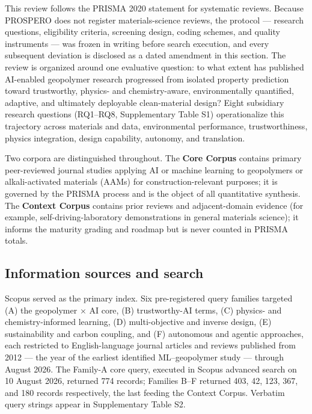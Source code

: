\documentclass[pdflatex,sn-basic]{sn-jnl}
\begin{document}
This review follows the PRISMA 2020 statement for systematic reviews. Because PROSPERO does not register materials-science reviews, the protocol --- research questions, eligibility criteria, screening design, coding schemes, and quality instruments --- was frozen in writing before search execution, and every subsequent deviation is disclosed as a dated amendment in this section. The review is organized around one evaluative question: to what extent has published AI-enabled geopolymer research progressed from isolated property prediction toward trustworthy, physics- and chemistry-aware, environmentally quantified, adaptive, and ultimately deployable clean-material design? Eight subsidiary research questions (RQ1--RQ8, Supplementary Table S1) operationalize this trajectory across materials and data, environmental performance, trustworthiness, physics integration, design capability, autonomy, and translation.

Two corpora are distinguished throughout. The \textbf{Core Corpus} contains primary peer-reviewed journal studies applying AI or machine learning to geopolymers or alkali-activated materials (AAMs) for construction-relevant purposes; it is governed by the PRISMA process and is the object of all quantitative synthesis. The \textbf{Context Corpus} contains prior reviews and adjacent-domain evidence (for example, self-driving-laboratory demonstrations in general materials science); it informs the maturity grading and roadmap but is never counted in PRISMA totals.

\subsection{Information sources and search}

Scopus served as the primary index. Six pre-registered query families targeted (A) the geopolymer $\times$ AI core, (B) trustworthy-AI terms, (C) physics- and chemistry-informed learning, (D) multi-objective and inverse design, (E) sustainability and carbon coupling, and (F) autonomous and agentic approaches, each restricted to English-language journal articles and reviews published from 2012 --- the year of the earliest identified ML--geopolymer study --- through August 2026. The Family-A core query, executed in Scopus advanced search on 10 August 2026, returned 774 records; Families B--F returned 403, 42, 123, 367, and 180 records respectively, the last feeding the Context Corpus. Verbatim query strings appear in Supplementary Table S2.
\end{document}
